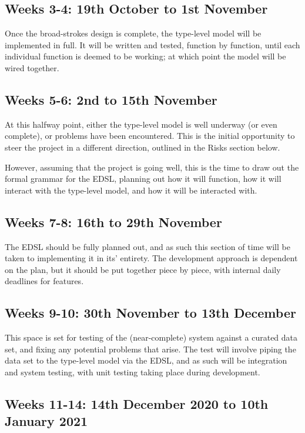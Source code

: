 \documentclass[12pt, a4paper]{scrartcl}
\begin{document}
\subsection{Weeks 3-4: 19th October to 1st November}

Once the broad-strokes design is complete, the type-level model will be implemented in full. It will be written and tested, function by function, until each individual function is deemed to be working; at which point the model will be wired together.

\subsection{Weeks 5-6: 2nd to 15th November}

At this halfway point, either the type-level model is well underway (or even complete), or problems have been encountered. This is the initial opportunity to steer the project in a different direction, outlined in the Risks section below.

However, assuming that the project is going well, this is the time to draw out the formal grammar for the EDSL, planning out how it will function, how it will interact with the type-level model, and how it will be interacted with.

\subsection{Weeks 7-8: 16th to 29th November}

The EDSL should be fully planned out, and as such this section of time will be taken to implementing it in its' entirety. The development approach is dependent on the plan, but it should be put together piece by piece, with internal daily deadlines for features.

\subsection{Weeks 9-10: 30th November to 13th December}

This space is set for testing of the (near-complete) system against a curated data set, and fixing any potential problems that arise. The test will involve piping the data set to the type-level model via the EDSL, and as such will be integration and system testing, with unit testing taking place during development.

\subsection{Weeks 11-14: 14th December 2020 to 10th January 2021}
\end{document}
